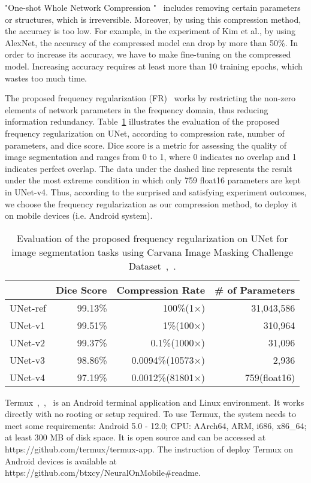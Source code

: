 \documentclass[conference]{IEEEtran}
\begin{document}
"One-shot Whole Network Compression "~\cite{kim2016oneshot} includes removing certain parameters or structures, which is irreversible. Moreover, by using this compression method, the accuracy is too low. For example, in the experiment of Kim et al., by using AlexNet, the accuracy of the compressed model can drop by more than 50\%. In order to increase its accuracy, we have to make fine-tuning on the compressed model. Increasing accuracy requires at least more than 10 training epochs, which wastes too much time.

The proposed frequency regularization (FR)~\cite{zhao2023fr} works by restricting the non-zero elements of network parameters in the frequency domain, thus reducing information redundancy. Table~\ref{table:fr_unet} illustrates the evaluation of the proposed frequency regularization on UNet, according to compression rate, number of parameters, and dice score. Dice score is a metric for assessing the quality of image segmentation and ranges from 0 to 1, where 0 indicates no overlap and 1 indicates perfect overlap. The data under the dashed line represents the result under the most extreme condition in which only 759 float16 parameters are kept in UNet-v4. Thus, according to the surprised and satisfying experiment outcomes, we choose the frequency regularization as our compression method, to deploy it on mobile devices (i.e. Android system).

\begin{table}[H]
	\caption{Evaluation of the proposed frequency regularization on UNet for image segmentation tasks using Carvana Image Masking Challenge Dataset~\cite{zhao2023fr},~\cite{brian2017carvanadataset}.} 
	\label{table:fr_unet}
	\small
	\centering
	\begin{tabular}{p{1.15cm}rrr}
		\toprule\toprule
		&Dice Score&Compression Rate&\# of Parameters\\ 
		\midrule
		UNet-ref&99.13\%&100\%(1×)&31,043,586\\
		UNet-v1&99.51\%&1\%(100×)&310,964\\
		UNet-v2&99.37\%&0.1\%(1000×)&31,096\\
		UNet-v3&98.86\%&0.0094\%(10573×)&2,936\\
		\cdashline{1-4}
		UNet-v4&97.19\%&0.0012\%(81801×)&759(float16)\\
		\bottomrule
	\end{tabular}
\end{table}

Termux~\cite{termux_repo},~\cite{termux_overview},~\cite{termux_wiki}  is an Android terminal application and Linux environment. It works directly with no rooting or setup required. To use Termux, the system needs to meet some requirements: Android 5.0 - 12.0; CPU: AArch64, ARM, i686, x86\_64; at least 300 MB of disk space. It is open source and can be accessed at https://github.com/termux/termux-app. The instruction of deploy Termux on Android devices is available at https://github.com/btxcy/NeuralOnMobile\#readme. 
\end{document}
